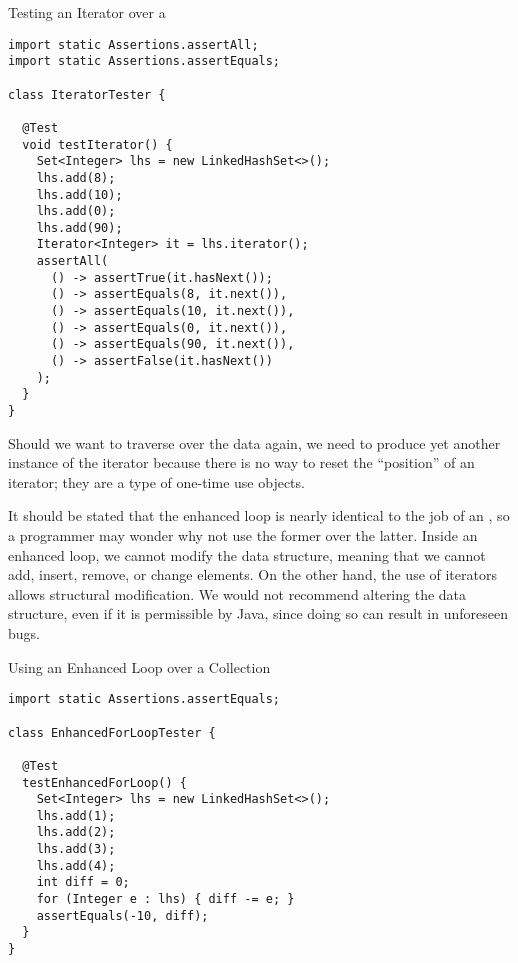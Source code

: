 \begin{cl}{Testing an Iterator over a }
\begin{lstlisting}[language=MyJava]
import static Assertions.assertAll;
import static Assertions.assertEquals;

class IteratorTester {

  @Test
  void testIterator() {
    Set<Integer> lhs = new LinkedHashSet<>();
    lhs.add(8);
    lhs.add(10);
    lhs.add(0);
    lhs.add(90);
    Iterator<Integer> it = lhs.iterator();
    assertAll(
      () -> assertTrue(it.hasNext());
      () -> assertEquals(8, it.next()),
      () -> assertEquals(10, it.next()),
      () -> assertEquals(0, it.next()),
      () -> assertEquals(90, it.next()),
      () -> assertFalse(it.hasNext())
    );
  }
} 
\end{lstlisting}
\end{cl}

Should we want to traverse over the data again, we need to produce yet another instance of the iterator because there is no way to reset the ``position'' of an iterator; they are a type of one-time use objects.

It should be stated that the enhanced  loop is nearly identical to the job of an , so a programmer may wonder why not use the former over the latter. Inside an enhanced  loop, we cannot modify the data structure, meaning that we cannot add, insert, remove, or change elements. On the other hand, the use of iterators allows structural modification. We would not recommend altering the data structure, even if it is permissible by Java, since doing so can result in unforeseen bugs. 


\begin{cl}{Using an Enhanced  Loop over a Collection}
\begin{lstlisting}[language=MyJava]
import static Assertions.assertEquals;

class EnhancedForLoopTester {

  @Test
  testEnhancedForLoop() {
    Set<Integer> lhs = new LinkedHashSet<>();
    lhs.add(1);
    lhs.add(2);
    lhs.add(3);
    lhs.add(4);
    int diff = 0;
    for (Integer e : lhs) { diff -= e; }
    assertEquals(-10, diff);
  }
}
\end{lstlisting}
\end{cl}


